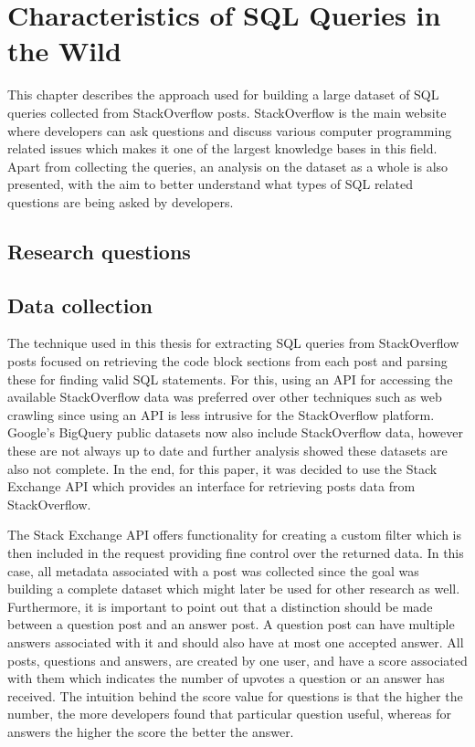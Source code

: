 \chapter{Characteristics of SQL Queries in the Wild}
\label{chapter:characteristics_sql_queries}

This chapter describes the approach used for building a large dataset of SQL queries collected from StackOverflow posts. StackOverflow is the main website where developers can ask questions and discuss various computer programming related issues which makes it one of the largest knowledge bases in this field. Apart from collecting the queries, an analysis on the dataset as a whole is also presented, with the aim to better understand what types of SQL related questions are being asked by developers.

\section{Research questions}

\section{Data collection}

The technique used in this thesis for extracting SQL queries from StackOverflow posts focused on retrieving the code block sections from each post and parsing these for finding valid SQL statements. For this, using an API for accessing the available StackOverflow data was preferred over other techniques such as web crawling since using an API is less intrusive for the StackOverflow platform. Google’s BigQuery public datasets now also include StackOverflow data, however these are not always up to date and further analysis showed these datasets are also not complete. In the end, for this paper, it was decided to use the Stack Exchange API which provides an interface for retrieving posts data from StackOverflow.

The Stack Exchange API offers functionality for creating a custom filter which is then included in the request providing fine control over the returned data. In this case, all metadata associated with a post was collected since the goal was building a complete dataset which might later be used for other research as well. Furthermore, it is important to point out that a distinction should be made between a question post and an answer post. A question post can have multiple answers associated with it and should also have at most one accepted answer. All posts, questions and answers, are created by one user, and have a score associated with them which indicates the number of upvotes a question or an answer has received. The intuition behind the score value for questions is that the higher the number, the more developers found that particular question useful, whereas for answers the higher the score the better the answer.

